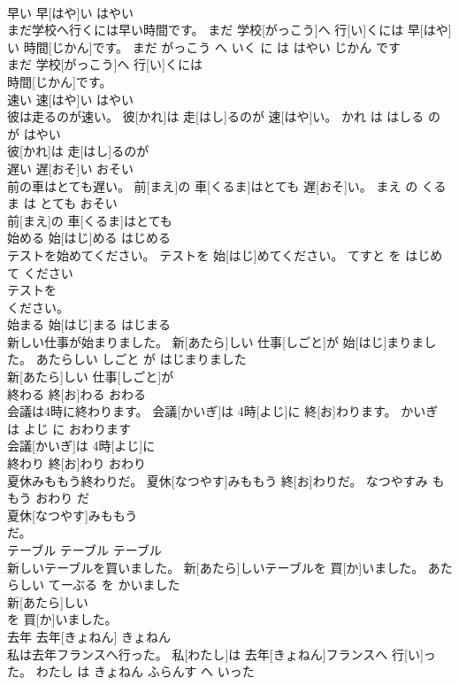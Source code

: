 \documentclass[8pt]{extreport}
\begin{document}
\begin{CJK}{UTF8}{min}
\\	早い	早[はや]い	はやい	
\\	まだ学校へ行くには早い時間です。	まだ 学校[がっこう]へ 行[い]くには 早[はや]い 時間[じかん]です。	まだ がっこう へ いく に は はやい じかん です	
\\	まだ 学校[がっこう]へ 行[い]くには
\\	時間[じかん]です。			
\\	速い	速[はや]い	はやい	
\\	彼は走るのが速い。	彼[かれ]は 走[はし]るのが 速[はや]い。	かれ は はしる の が はやい	
\\	彼[かれ]は 走[はし]るのが
\\	遅い	遅[おそ]い	おそい	
\\	前の車はとても遅い。	前[まえ]の 車[くるま]はとても 遅[おそ]い。	まえ の くるま は とても おそい	
\\	前[まえ]の 車[くるま]はとても
\\	始める	始[はじ]める	はじめる	
\\	テストを始めてください。	テストを 始[はじ]めてください。	てすと を はじめて ください	
\\	テストを
\\	ください。			
\\	始まる	始[はじ]まる	はじまる	
\\	新しい仕事が始まりました。	新[あたら]しい 仕事[しごと]が 始[はじ]まりました。	あたらしい しごと が はじまりました	
\\	新[あたら]しい 仕事[しごと]が
\\	終わる	終[お]わる	おわる	
\\	会議は4時に終わります。	会議[かいぎ]は 4時[よじ]に 終[お]わります。	かいぎ は よじ に おわります	
\\	会議[かいぎ]は 4時[よじ]に
\\	終わり	終[お]わり	おわり	
\\	夏休みももう終わりだ。	夏休[なつやす]みももう 終[お]わりだ。	なつやすみ も もう おわり だ	
\\	夏休[なつやす]みももう
\\	だ。			
\\	テーブル	テーブル	テーブル	
\\	新しいテーブルを買いました。	新[あたら]しいテーブルを 買[か]いました。	あたらしい てーぶる を かいました	
\\	新[あたら]しい
\\	を 買[か]いました。			
\\	去年	去年[きょねん]	きょねん	
\\	私は去年フランスへ行った。	私[わたし]は 去年[きょねん]フランスへ 行[い]った。	わたし は きょねん ふらんす へ いった	

\end{CJK}
\end{document}
